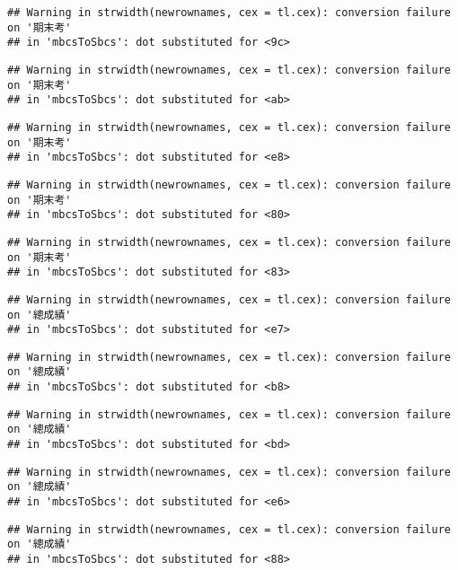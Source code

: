 \documentclass[
]{book}
\begin{document}
\begin{verbatim}
## Warning in strwidth(newrownames, cex = tl.cex): conversion failure on '期末考'
## in 'mbcsToSbcs': dot substituted for <9c>
\end{verbatim}

\begin{verbatim}
## Warning in strwidth(newrownames, cex = tl.cex): conversion failure on '期末考'
## in 'mbcsToSbcs': dot substituted for <ab>
\end{verbatim}

\begin{verbatim}
## Warning in strwidth(newrownames, cex = tl.cex): conversion failure on '期末考'
## in 'mbcsToSbcs': dot substituted for <e8>
\end{verbatim}

\begin{verbatim}
## Warning in strwidth(newrownames, cex = tl.cex): conversion failure on '期末考'
## in 'mbcsToSbcs': dot substituted for <80>
\end{verbatim}

\begin{verbatim}
## Warning in strwidth(newrownames, cex = tl.cex): conversion failure on '期末考'
## in 'mbcsToSbcs': dot substituted for <83>
\end{verbatim}

\begin{verbatim}
## Warning in strwidth(newrownames, cex = tl.cex): conversion failure on '總成績'
## in 'mbcsToSbcs': dot substituted for <e7>
\end{verbatim}

\begin{verbatim}
## Warning in strwidth(newrownames, cex = tl.cex): conversion failure on '總成績'
## in 'mbcsToSbcs': dot substituted for <b8>
\end{verbatim}

\begin{verbatim}
## Warning in strwidth(newrownames, cex = tl.cex): conversion failure on '總成績'
## in 'mbcsToSbcs': dot substituted for <bd>
\end{verbatim}

\begin{verbatim}
## Warning in strwidth(newrownames, cex = tl.cex): conversion failure on '總成績'
## in 'mbcsToSbcs': dot substituted for <e6>
\end{verbatim}

\begin{verbatim}
## Warning in strwidth(newrownames, cex = tl.cex): conversion failure on '總成績'
## in 'mbcsToSbcs': dot substituted for <88>
\end{verbatim}
\end{document}
